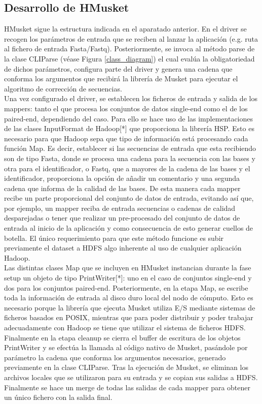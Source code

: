 \documentclass[conference]{IEEEtran}
\begin{document}
\subsection{Desarrollo de HMusket}
HMusket sigue la estructura indicada en el aparatado anterior. En el driver se recogen los parámetros de entrada que se reciben al lanzar la aplicación (e.g. ruta al fichero de entrada Fasta/Fastq). Posteriormente, se invoca al método parse de la clase CLIParse (véase Figura \ref{class_diagram}) el cual evalúa la obligatoriedad de dichos parámetros, configura parte del driver y genera una cadena que conforma los argumentos que recibirá la librería de Musket para ejecutar el algoritmo de corrección de secuencias.\\
Una vez configurado el driver, se establecen los ficheros de entrada y salida de los mappers: tanto el que procesa los conjuntos de datos single-end como el de los paired-end, dependiendo del caso. Para ello se hace uso de las implementaciones de las clases InputFormat de Hadoop[*] que proporciona la librería HSP. Esto es necesario para que Hadoop sepa que tipo de información está procesando cada función Map. Es decir, establecer si las secuencias de entrada que esta recibiendo son de tipo Fasta, donde se procesa una cadena para la secuencia con las bases y otra para el identificador, o Fastq, que a mayores de la cadena de las bases y el identificador, proporciona la opción de añadir un comentario y una segunda cadena que informa de la calidad de las bases. De esta manera cada mapper recibe un parte proporcional del conjunto de datos de entrada, evitando así que, por ejemplo, un mapper reciba de entrada secuencias o cadenas de calidad desparejadas o tener que realizar un pre-procesado del conjunto de datos de entrada al inicio de la aplicación y como consecuencia de esto generar cuellos de botella. El único requerimiento para que este método funcione es subir previamente el dataset a HDFS algo inherente al uso de cualquier aplicación Hadoop.\\

Las distintas clases Map que se incluyen en HMusket instancian durante la fase setup un objeto de tipo PrintWriter[*]: uno en el caso de conjuntos single-end y dos para los conjuntos paired-end. Posteriormente, en la etapa Map, se escribe toda la información de entrada al disco duro local del nodo de cómputo. Esto es necesario porque la librería que ejecuta Musket utiliza E/S mediante sistemas de ficheros basados en POSIX, mientras que para poder distribuir y poder trabajar adecuadamente con Hadoop se tiene que utilizar el sistema de ficheros HDFS.\\
Finalmente en la etapa cleanup se cierra el buffer de escritura de los objetos PrintWriter y se efectúa la llamada al código nativo de Musket, pasándole por parámetro la cadena que conforma los argumentos necesarios, generado previamente en la clase CLIParse. Tras la ejecución de Musket, se eliminan los archivos locales que se utilizaron para su entrada y se copian sus salidas a HDFS. Finalmente se hace un merge de todas las salidas de cada mapper para obtener un único fichero con la salida final.\\
\end{document}
